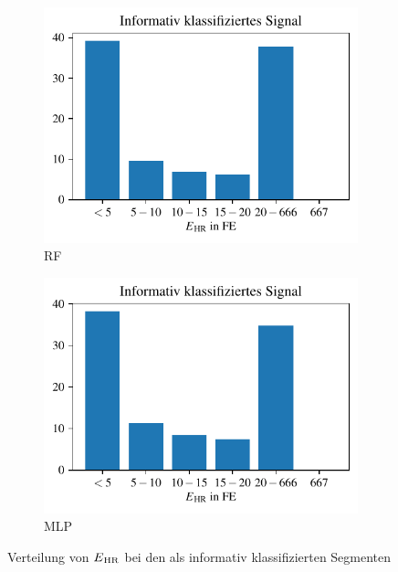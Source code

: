  \begin{figure}[H]
 	\centering
		\begin{subfigure}{.45\textwidth}
			\centering
 			\includegraphics[scale=0.7]{pic/rf-statistical-positives.pdf}
 			\caption[RF]{RF}
 		\end{subfigure}
    	\begin{subfigure}{.45\textwidth}
    		\centering
 			\includegraphics[scale=0.7]{pic/mlp-statistical-positives.pdf}
 			\caption[MLP]{MLP}
 		\end{subfigure}
 	\caption[Verteilung von $E\textsubscript{HR}$ bei den als informativ klassifizierten Segmenten]{Verteilung von $E\textsubscript{HR}$ bei den als informativ klassifizierten Segmenten}
 	\label{fig:ml-statistical-positives}
 \end{figure}
 
